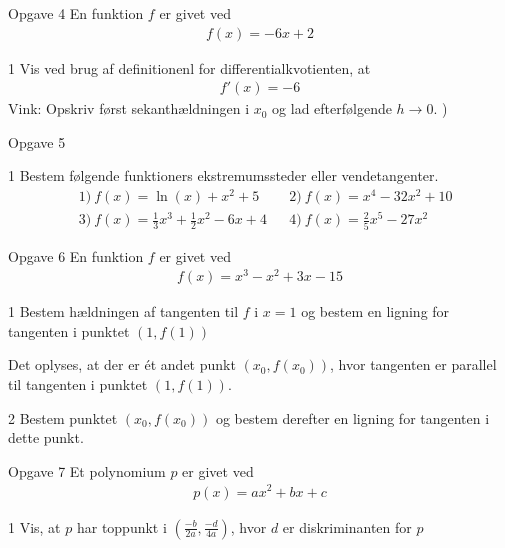 \newpage
%
%
%
%
%
\begin{opgavetekst}{Opgave 4}
	En funktion $f$ er givet ved
	\begin{align*}
		f(x) = -6x + 2
	\end{align*}
\end{opgavetekst}
\begin{delopgave}{1}
	Vis ved brug af definitionenl for differentialkvotienten, at 
	\begin{align*}
		f'(x) = -6 
	\end{align*}
	Vink: Opskriv først sekanthældningen i $x_0$ og lad efterfølgende $h \to 0$. )
\end{delopgave}
%
%
%
%
%
\begin{opgavetekst}{Opgave 5}
\end{opgavetekst}
\begin{delopgave}{1}
	Bestem følgende funktioners ekstremumssteder eller vendetangenter.
	\begin{align*}
		&1) \ f(x) = \ln(x) + x^2 + 5  &   &2) \ f(x) = x^4 - 32x^2 + 10 \\
		&3) \ f(x) = \frac{1}{3}x^3 + \frac{1}{2}x^2 - 6x + 4  &   &4) \ f(x) = \frac{2}{5}x^5-27x^2
	\end{align*}
\end{delopgave}
%
%
%
%
%
\begin{opgavetekst}{Opgave 6}
	En funktion $f$ er givet ved
	\begin{align*}
		f(x) = x^3 - x^2 + 3x - 15
	\end{align*}
\end{opgavetekst}
\begin{delopgave}{1}
	Bestem hældningen af tangenten til $f$ i $x = 1$ og bestem en ligning for tangenten i punktet $(1,f(1))$
\end{delopgave}
\begin{meretekst}
	Det oplyses, at der er ét andet punkt $(x_0,f(x_0))$, hvor tangenten er parallel til tangenten i punktet $(1,f(1))$.
\end{meretekst}
\begin{delopgave}{2}
	Bestem punktet $(x_0,f(x_0))$ og bestem derefter en ligning for tangenten i dette punkt.
\end{delopgave}
%
%
%
%
%
\begin{opgavetekst}{Opgave 7}
	Et polynomium $p$ er givet ved
	\begin{align*}
		p(x) = ax^2 + bx + c
	\end{align*}
\end{opgavetekst}
\begin{delopgave}{1}
	Vis, at $p$ har toppunkt i $\left(\frac{-b}{2a}, \frac{-d}{4a}\right)$, hvor $d$ er diskriminanten for $p$
\end{delopgave}
%
%
%
%

